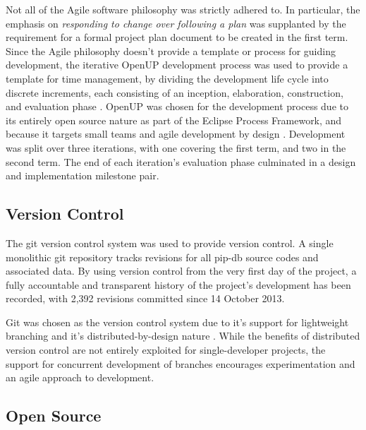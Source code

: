 Not all of the Agile software philosophy was strictly adhered to. In
particular, the emphasis on \textit{responding to change over
  following a plan} was supplanted by the requirement for a formal
project plan document to be created in the first term. Since the Agile
philosophy doesn't provide a template or process for guiding
development, the iterative OpenUP development process was used to
provide a template for time management, by dividing the development
life cycle into discrete increments, each consisting of an inception,
elaboration, construction, and evaluation phase
\cite{balduino2007introduction}. OpenUP was chosen for the development
process due to its entirely open source nature as part of the Eclipse
Process Framework, and because it targets small teams and agile
development by design \cite{kroll2006agility}. Development was split
over three iterations, with one covering the first term, and two in
the second term. The end of each iteration's evaluation phase
culminated in a design and implementation milestone pair.

\subsection{Version Control}\label{subsec:version-control}

The git version control system was used to provide version control. A
single monolithic git repository tracks revisions for all pip-db
source codes and associated data. By using version control from the
very first day of the project, a fully accountable and transparent
history of the project's development has been recorded, with 2,392
revisions committed since 14 October 2013.

Git was chosen as the version control system due to it's support for
lightweight branching and it's distributed-by-design nature
\cite{chacon2009pro}. While the benefits of distributed version
control are not entirely exploited for single-developer projects, the
support for concurrent development of branches encourages
experimentation and an agile approach to development.

\subsection{Open Source}\label{subsec:open-source}

